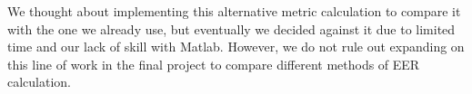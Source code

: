 \documentclass[11pt]{article}
\begin{document}
We thought about implementing this alternative metric calculation to compare it with the one we already use, but eventually we decided against it due to limited time and our lack of skill with Matlab. However, we do not rule out expanding on this line of work in the final project to compare different methods of EER calculation.

\end{document}

